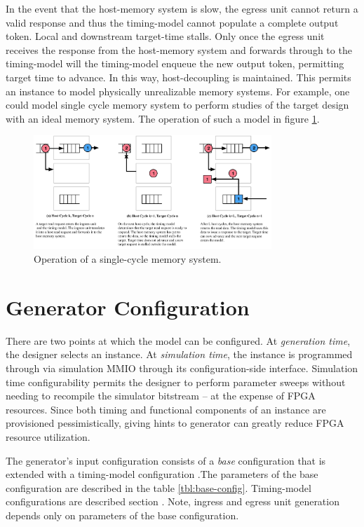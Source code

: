 In the event that the host-memory system is slow, the egress unit cannot return
a valid response and thus the timing-model cannot populate a complete output
token. Local and downstream target-time stalls. Only once the egress unit
receives the response from the host-memory system and forwards through to the
timing-model will the timing-model enqueue the new output token, permitting
target time to advance.  In this way, host-decoupling is maintained. This
permits an instance to model physically unrealizable memory systems. For
example, one could model single cycle memory system to perform studies of the
target design with an ideal memory system. The operation of such a model in
figure \ref{fig:model_operation}.

\begin{figure} \centering
\includegraphics[width=0.8\textwidth]{figures/memory-model-operation.pdf}
\caption{Operation of a single-cycle memory system.}
\label{fig:model_operation} \end{figure}

\section{Generator Configuration}\label{sec:generator-parameters}

There are two points at which the model can be configured.  At
\textit{generation time}, the designer selects an instance. At
\textit{simulation time}, the instance is programmed through via simulation
MMIO through its configuration-side interface. Simulation time configurability
permits the designer to perform parameter sweeps without needing to recompile
the simulator bitstream -- at the expense of FPGA resources. Since both timing
and functional components of an instance are provisioned pessimistically,
giving hints to generator can greatly reduce FPGA resource utilization.

The generator's input configuration consists of a \emph{base} configuration
that is extended with a timing-model configuration .The parameters of the base
configuration are described in the table \ref{tbl:base-config}. Timing-model
configurations are described section \label{sec:timing-model}.  Note, ingress
and egress unit generation depends only on parameters of the base
configuration.

